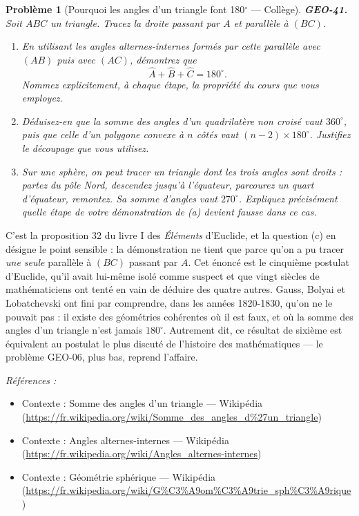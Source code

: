 \documentclass[11pt]{article}
\newtheorem{problem}{Problème}
\newenvironment{refs}{\par\small\noindent\emph{Références :}\begin{itemize}\setlength\itemsep{0pt}}{\end{itemize}\normalsize}
\begin{document}
\begin{problem}[{Pourquoi les angles d'un triangle font 180$^\circ$ --- Collège}]
\textbf{GEO-41.} Soit $ ABC $ un triangle. Tracez la droite passant par $ A $ et parallèle à
$ (BC) $.
\begin{enumerate}
\item[(a)] En utilisant les angles alternes-internes formés par cette parallèle avec $ (AB) $ puis avec
$ (AC) $, démontrez que
\[ \widehat{A} + \widehat{B} + \widehat{C} = 180^\circ . \]
Nommez explicitement, à chaque étape, la propriété du cours que vous employez.
\item[(b)] Déduisez-en que la somme des angles d'un quadrilatère non croisé vaut $ 360^\circ $, puis que
celle d'un polygone convexe à $ n $ côtés vaut $ (n-2) \times 180^\circ $. Justifiez le découpage
que vous utilisez.
\item[(c)] Sur une sphère, on peut tracer un triangle dont les trois angles sont droits : partez du pôle
Nord, descendez jusqu'à l'équateur, parcourez un quart d'équateur, remontez. Sa somme d'angles vaut
$ 270^\circ $. Expliquez précisément quelle étape de votre démonstration de (a) devient fausse dans
ce cas.
\end{enumerate}

\end{problem}

\noindent C'est la proposition 32 du livre I des \textit{Éléments} d'Euclide, et la question (c)
en désigne le point sensible : la démonstration ne tient que parce qu'on a pu tracer \textit{une seule}
parallèle à $ (BC) $ passant par $ A $. Cet énoncé est le cinquième postulat d'Euclide, qu'il
avait lui-même isolé comme suspect et que vingt siècles de mathématiciens ont tenté en vain de
déduire des quatre autres. Gauss, Bolyai et Lobatchevski ont fini par comprendre, dans les années
1820-1830, qu'on ne le pouvait pas : il existe des géométries cohérentes où il est faux, et où la
somme des angles d'un triangle n'est jamais $ 180^\circ $. Autrement dit, ce résultat de sixième est
équivalent au postulat le plus discuté de l'histoire des mathématiques --- le problème GEO-06, plus bas,
reprend l'affaire.

\begin{refs}
\item Contexte : Somme des angles d'un triangle --- Wikipédia (\url{https://fr.wikipedia.org/wiki/Somme_des_angles_d%27un_triangle})
\item Contexte : Angles alternes-internes --- Wikipédia (\url{https://fr.wikipedia.org/wiki/Angles_alternes-internes})
\item Contexte : Géométrie sphérique --- Wikipédia (\url{https://fr.wikipedia.org/wiki/G%C3%A9om%C3%A9trie_sph%C3%A9rique})
\end{refs}
\end{document}
